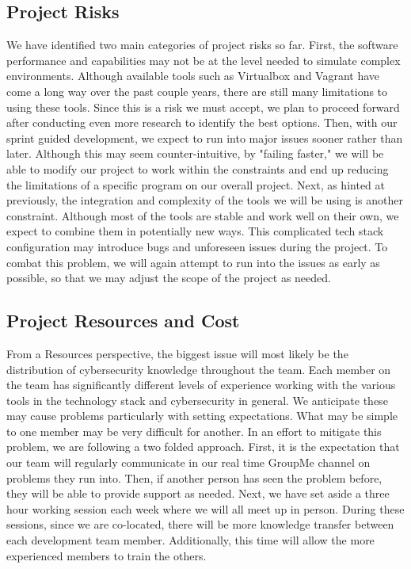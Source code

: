 \documentclass[openright]{report}
\begin{document}
\subsection{Project Risks}

\par We have identified two main categories of project risks so far. First, the software performance and capabilities may not be at the level needed to simulate complex environments. Although available tools such as Virtualbox and Vagrant have come a long way over the past couple years, there are still many limitations to using these tools. Since this is a risk we must accept, we plan to proceed forward after conducting even more research to identify the best options. Then, with our sprint guided development, we expect to run into major issues sooner rather than later. Although this may seem counter-intuitive, by "failing faster," we will be able to modify our project to work within the constraints and end up reducing the limitations of a specific program on our overall project. Next, as hinted at previously, the integration and complexity of the tools we will be using is another constraint. Although most of the tools are stable and work well on their own, we expect to combine them in potentially new ways. This complicated tech stack configuration may introduce bugs and unforeseen issues during the project. To combat this problem, we will again attempt to run into the issues as early as possible, so that we may adjust the scope of the project as needed.

\subsection{Project Resources and Cost}

\par From a Resources perspective, the biggest issue will most likely be the distribution of cybersecurity knowledge throughout the team. Each member on the team has significantly different levels of experience working with the various tools in the technology stack and cybersecurity in general. We anticipate these may cause problems particularly with setting expectations. What may be simple to one member may be very difficult for another. In an effort to mitigate this problem, we are following a two folded approach. First, it is the expectation that our team will regularly communicate in our real time GroupMe channel on problems they run into. Then, if another person has seen the problem before, they will be able to provide support as needed. Next, we have set aside a three hour working session each week where we will all meet up in person. During these sessions, since we are co-located, there will be more knowledge transfer between each development team member. Additionally, this time will allow the more experienced members to train the others. 
\end{document}
